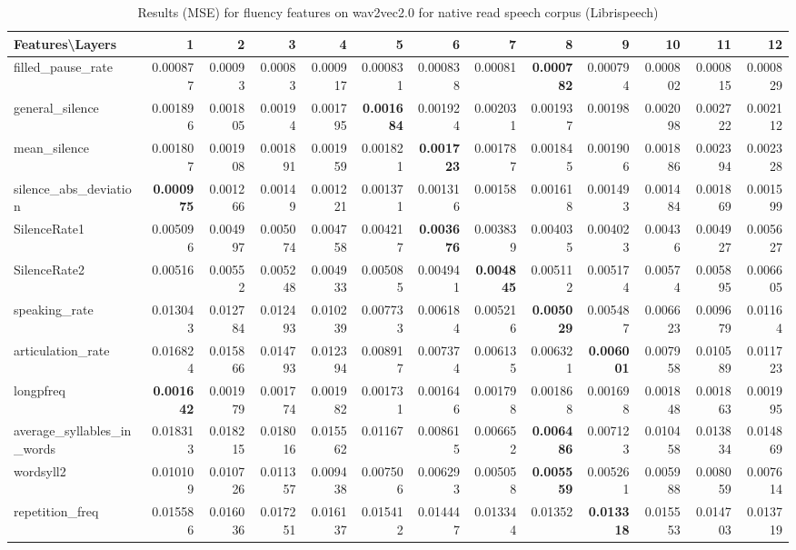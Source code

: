 \documentclass[sigconf]{acmart}
\begin{document}
\begin{table*}[!htbp]
\begin{adjustbox}{width=1\textwidth}
\begin{tabular}{@{}l|rrrrrrrrrrrr@{}}
\toprule
\textbf{Features\textbackslash Layers} & 1 & 2 & 3 & 4 & 5 & 6 & 7 & 8 & 9 & 10 & 11 & 12 \\ \midrule
filled\_pause\_rate & 0.000877 & 0.00093 & 0.00083 & 0.000917 & 0.000831 & 0.000838 & 0.00081 & \textbf{0.000782} & 0.000794 & 0.000802 & 0.000815 & 0.000829 \\
general\_silence & 0.001896 & 0.001805 & 0.00194 & 0.001795 & \textbf{0.001684} & 0.001924 & 0.002031 & 0.001937 & 0.00198 & 0.002098 & 0.002722 & 0.002112 \\
mean\_silence & 0.001807 & 0.001908 & 0.001891 & 0.001959 & 0.001821 & \textbf{0.001723} & 0.001787 & 0.001845 & 0.001906 & 0.001886 & 0.002394 & 0.002328 \\
silence\_abs\_deviation & \textbf{0.000975} & 0.001266 & 0.00149 & 0.001221 & 0.001371 & 0.001316 & 0.00158 & 0.001618 & 0.001493 & 0.001484 & 0.001869 & 0.001599 \\
SilenceRate1 & 0.005096 & 0.004997 & 0.005074 & 0.004758 & 0.004217 & \textbf{0.003676} & 0.003839 & 0.004035 & 0.004023 & 0.00436 & 0.004927 & 0.005627 \\
SilenceRate2 & 0.00516 & 0.00552 & 0.005248 & 0.004933 & 0.005085 & 0.004941 & \textbf{0.004845} & 0.005112 & 0.005174 & 0.00574 & 0.005895 & 0.006605 \\
speaking\_rate & 0.013043 & 0.012784 & 0.012493 & 0.010239 & 0.007733 & 0.006184 & 0.005216 & \textbf{0.005029} & 0.005487 & 0.006623 & 0.009679 & 0.01164 \\
articulation\_rate & 0.016824 & 0.015866 & 0.014793 & 0.012394 & 0.008917 & 0.007374 & 0.006135 & 0.006321 & \textbf{0.006001} & 0.007958 & 0.010589 & 0.011723 \\
longpfreq & \textbf{0.001642} & 0.001979 & 0.001774 & 0.001982 & 0.001731 & 0.001646 & 0.001798 & 0.001868 & 0.001698 & 0.001848 & 0.001863 & 0.001995 \\
average\_syllables\_in\_words & 0.018313 & 0.018215 & 0.018016 & 0.015562 & 0.01167 & 0.008615 & 0.006652 & \textbf{0.006486} & 0.007123 & 0.010458 & 0.013834 & 0.014869 \\
wordsyll2 & 0.010109 & 0.010726 & 0.011357 & 0.009438 & 0.007506 & 0.006293 & 0.005058 & \textbf{0.005559} & 0.005261 & 0.005988 & 0.008059 & 0.007614 \\
repetition\_freq & 0.015586 & 0.016036 & 0.017251 & 0.016137 & 0.015412 & 0.014447 & 0.013344 & 0.01352 & \textbf{0.013318} & 0.015553 & 0.014703 & 0.013719
\\\bottomrule
\end{tabular}
\end{adjustbox}
\vspace{1 mm}
\caption{\label{Fluency_W} \small  Results (MSE) for fluency features on wav2vec2.0 for native read speech corpus (Librispeech)}

\end{table*}
\end{document}
